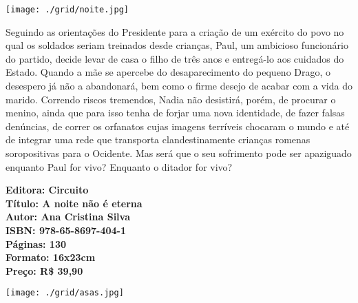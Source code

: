 \pagebreak %


\begin{center}
\hspace*{-3.6cm}
\hspace*{3.1cm}\texttt{[image: ./grid/noite.jpg]}
\end{center}

\hspace*{-7cm}\hrulefill\hspace*{-7cm}

\medskip

\noindent{} Seguindo as orientações do Presidente para a criação de um exército do povo no qual os soldados seriam treinados desde crianças, Paul, um ambicioso funcionário do partido, decide levar de casa o filho de três anos e entregá-lo aos cuidados do Estado. Quando a mãe se apercebe do desaparecimento do pequeno Drago, o desespero já não a abandonará,
bem como o firme desejo de acabar com a vida do marido. Correndo riscos tremendos,
Nadia não desistirá, porém, de procurar o menino, ainda que para isso tenha de forjar
uma nova identidade, de fazer falsas denúncias, de correr os orfanatos cujas imagens
terríveis chocaram o mundo e até de integrar uma rede que transporta clandestinamente
crianças romenas soropositivas para o Ocidente. Mas será que o seu sofrimento pode
ser apaziguado enquanto Paul for vivo? Enquanto o ditador for vivo?

\vfill

\hspace*{-.4cm}\begin{minipage}[c]{1\linewidth}
\small\textbf{
\hspace*{-.1cm}Editora: Circuito\\
Título: A noite não é eterna\\
Autor: Ana Cristina Silva\\ 
ISBN: 978-65-8697-404-1\\
Páginas: 130\\
Formato: 16x23cm\\
Preço: R\$ 39,90\\
}
\end{minipage}

\pagebreak

\begin{center}
\hspace*{.5cm}\texttt{[image: ./grid/asas.jpg]}
\end{center}

